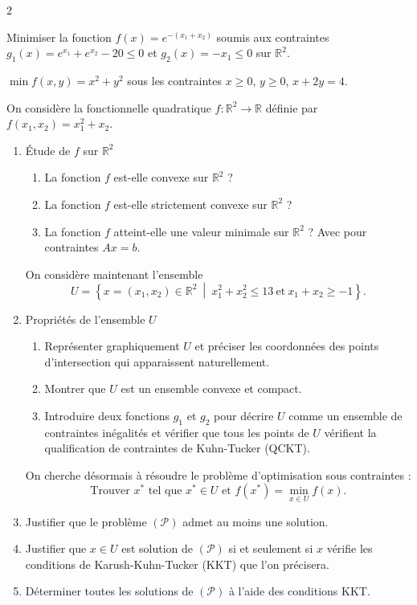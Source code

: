 \begin{multicols}{2}
\begin{exercice}
	Minimiser la fonction $f(x) = e^{-(x_{1} + x_{2})}$ soumis aux contraintes $g_{1}(x) = e^{x_{1}} + e^{x_{2}} - 20 \leqslant 0$ et $g_{2}(x) = -x_{1} \leqslant 0$ sur $\mathbb{R}^{2}$.
\end{exercice}

\begin{exercice}
	$\min f(x, y) = x^{2} + y^{2}$ sous les contraintes $x \geqslant 0$, $y \geqslant 0$, $x + 2y = 4$.
\end{exercice}

\begin{exercice}
	On considère la fonctionnelle quadratique $f : \mathbb{R}^{2} \rightarrow \mathbb{R}$ définie par $f(x_{1}, x_{2}) = x_{1}^{2} + x_{2}$.
	\begin{enumerate}[label=\arabic*.]
		\item Étude de $f$ sur $\mathbb{R}^{2}$
		\begin{enumerate}[label=\alph*.]
			\item La fonction $f$ est-elle convexe sur $\mathbb{R}^{2}$ ?
			\item La fonction $f$ est-elle strictement convexe sur $\mathbb{R}^{2}$ ?
			\item La fonction $f$ atteint-elle une valeur minimale sur $\mathbb{R}^{2}$ ? Avec pour contraintes $Ax = b$.
		\end{enumerate}
		On considère maintenant l'ensemble
		\[
		U = \left\{ x = (x_{1}, x_{2}) \in \mathbb{R}^{2} \ \middle| \ x_{1}^{2} + x_{2}^{2} \leqslant 13 \ \text{et} \ x_{1} + x_{2} \geqslant -1 \right\}.
		\]
		\item Propriétés de l'ensemble $U$
		\begin{enumerate}[label=\alph*.]
			\item Représenter graphiquement $U$ et préciser les coordonnées des points d'intersection qui apparaissent naturellement.
			\item Montrer que $U$ est un ensemble convexe et compact.
			\item Introduire deux fonctions $g_{1}$ et $g_{2}$ pour décrire $U$ comme un ensemble de contraintes inégalités et vérifier que tous les points de $U$ vérifient la qualification de contraintes de Kuhn-Tucker (QCKT).
		\end{enumerate}
		On cherche désormais à résoudre le problème d'optimisation sous contraintes :
		\[
		\text{Trouver } x^{*} \text{ tel que } x^{*} \in U \text{ et } f(x^{*}) = \min_{x \in U} f(x).
		\]
		\item Justifier que le problème $(\mathcal{P})$ admet au moins une solution.
		\item Justifier que $x \in U$ est solution de $(\mathcal{P})$ si et seulement si $x$ vérifie les conditions de Karush-Kuhn-Tucker (KKT) que l'on précisera.
		\item Déterminer toutes les solutions de $(\mathcal{P})$ à l'aide des conditions KKT.
	\end{enumerate}
\end{exercice}


\end{multicols}
